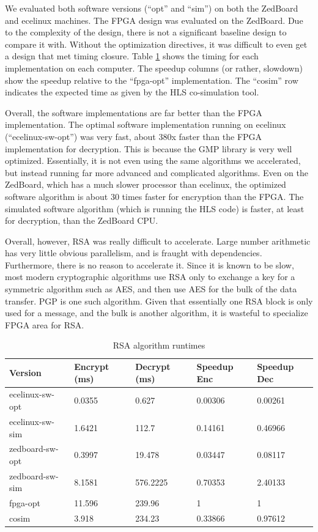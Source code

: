 We evaluated both software versions (``opt'' and ``sim'') on both the ZedBoard and ecelinux machines.
The FPGA design was evaluated on the ZedBoard. Due to the complexity of the design, there is not a 
significant baseline design to compare it with. Without the optimization directives, it was difficult
to even get a design that met timing closure. Table \ref{table:rsadata} shows the timing for each implementation
on each computer. The speedup columns (or rather, slowdown) show the speedup relative to the ``fpga-opt'' implementation.
The ``cosim'' row indicates the expected time as given by the HLS co-simulation tool.

Overall, the software implementations are far better than the FPGA implementation. The optimal 
software implementation running on ecelinux (``ecelinux-sw-opt'') was very fast, about 380x faster
than the FPGA implementation for decryption. This is because the GMP library is very well optimized.
Essentially, it is not even using the same algorithms we accelerated, but instead running far more advanced
and complicated algorithms. Even on the ZedBoard, which has a much slower processor than ecelinux, 
the optimized software algorithm is about 30 times faster for encryption than the FPGA.
The simulated software algorithm (which is running the HLS code) is faster, at least for decryption, 
than the ZedBoard CPU.

Overall, however, RSA was really difficult to accelerate. Large number arithmetic has very little obvious parallelism,
and is fraught with dependencies. Furthermore, there is no reason to accelerate it. Since it is known to be slow,
most modern cryptographic algorithms use RSA only to exchange a key for a symmetric algorithm such as AES, and then use AES
for the bulk of the data transfer. PGP is one such algorithm. Given that essentially one RSA block is only used
for a message, and the bulk is another algorithm, it is wasteful to specialize FPGA area for RSA.

\begin{table}[h]
\centering
\begin{tabular}{@{}lllll@{}}
\toprule
Version         & Encrypt (ms) & Decrypt (ms) & Speedup Enc & Speedup Dec \\ \midrule
ecelinux-sw-opt & 0.0355       & 0.627        & 0.00306     & 0.00261     \\
ecelinux-sw-sim & 1.6421       & 112.7        & 0.14161     & 0.46966     \\
zedboard-sw-opt & 0.3997       & 19.478       & 0.03447     & 0.08117     \\
zedboard-sw-sim & 8.1581       & 576.2225     & 0.70353     & 2.40133     \\
fpga-opt        & 11.596       & 239.96       & 1           & 1           \\
cosim           & 3.918        & 234.23       & 0.33866     & 0.97612     \\ \bottomrule
\end{tabular}
\label{table:rsadata}
\caption{RSA algorithm runtimes}
\end{table}
